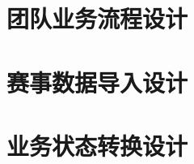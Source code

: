 \documentclass[UTF8,a4paper,10pt,fontset=fandol]{ctexart}
\begin{document}
\section{团队业务流程设计}

\clearpage

\clearpage

\clearpage

\section{赛事数据导入设计}

\clearpage

\section{业务状态转换设计}

\clearpage

\end{document}
